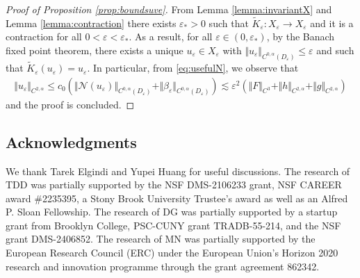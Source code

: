 \documentclass[11pt,reqno]{amsproc}
\newcommand{\N}{\mathcal{N}}
\newcommand{\ve}{\varepsilon}
\numberwithin{equation}{section}
\numberwithin{theorem}{section}
\numberwithin{prop}{section}
\numberwithin{cor}{section}
\numberwithin{lemma}{section}
\theoremstyle{remark}
\theoremstyle{definition}
\begin{document}
\begin{proof}[Proof of Proposition \ref{prop:boundsuve}]
From Lemma \ref{lemma:invariantX} and Lemma \ref{lemma:contraction} there exists $\ve_*>0$ such that $\widetilde{K}_\ve:X_\ve \rightarrow X_\ve$ and it is a contraction for all $0 < \ve <\ve_*$. As a result, for all $\ve\in (0,\ve_*)$, by the Banach fixed point theorem, there exists a unique $u_\ve\in X_\ve$ with $\Vert u_\ve \Vert_{C^{0,\alpha}(D_\ve)}\leq \ve$ and such that $\widetilde{K}_\ve(u_\ve) = u_\ve$. In particular, from \eqref{eq:usefulN}, we observe that
\begin{align*}
\Vert u_\ve \Vert_{C^{2,\alpha}} \leq c_0 \left( \Vert \N(u_\ve) \Vert_{C^{0,\alpha}(D_\ve)} + \Vert \beta_\ve \Vert_{C^{0,\alpha}(D_\ve)}\right) \lesssim \ve^2 \left( \Vert F \Vert_{C^3} + \Vert h \Vert_{C^{2,\alpha}} + \Vert g \Vert_{C^{2,\alpha}} \right)
\end{align*}
and the proof is concluded.
\end{proof}


 \subsection*{Acknowledgments}   We thank Tarek Elgindi and Yupei Huang for useful discussions.
The research of TDD was partially supported by the NSF DMS-2106233 grant, NSF CAREER award \#2235395, a Stony Brook University Trustee's award as well as an Alfred P. Sloan Fellowship. The research of
DG was partially supported by a startup grant from Brooklyn College, PSC-CUNY grant TRADB-55-214, and
the NSF grant DMS-2406852.
The research of MN was partially supported by the European Research Council (ERC) under the European Union’s Horizon 2020 research and innovation programme through the grant agreement 862342.



\end{document}
